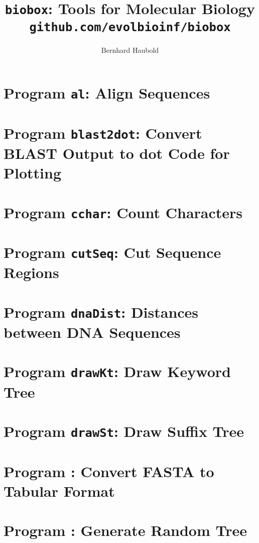 \documentclass[a4paper]{report}
\begin{document}
\pagestyle{noweb}

\title{\texttt{biobox}: Tools for Molecular Biology\\
\small\texttt{github.com/evolbioinf/biobox}}
\author{Bernhard Haubold}
\maketitle
\tableofcontents

\chapter{Program \texttt{al}: Align Sequences}\label{ch:al}

\chapter{Program \texttt{blast2dot}: Convert BLAST Output to dot Code
  for Plotting}\label{ch:b2d}

\chapter{Program \texttt{cchar}: Count Characters}\label{ch:cch}

\chapter{Program \texttt{cutSeq}: Cut Sequence Regions}\label{ch:cut}

\chapter{Program \texttt{dnaDist}: Distances between DNA Sequences}\label{ch:dna}

\chapter{Program \texttt{drawKt}: Draw Keyword Tree}\label{ch:dkt}

\chapter{Program \texttt{drawSt}: Draw Suffix Tree}\label{ch:dst}

\chapter{Program : Convert FASTA to Tabular
  Format}\label{ch:f2t}

\chapter{Program : Generate Random Tree}\label{ch:gt}

\end{document}

